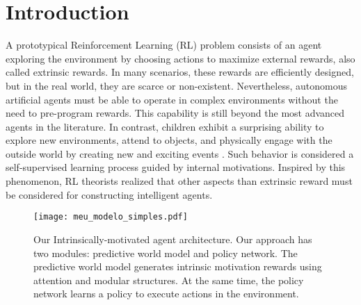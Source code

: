 \section{Introduction}
\label{sec:introduction}



A prototypical Reinforcement Learning (RL) problem consists of an agent exploring the environment by choosing actions to maximize external rewards, also called extrinsic rewards. In many scenarios, these rewards are efficiently designed, but in the real world, they are scarce or non-existent. Nevertheless, autonomous artificial agents must be able to operate in complex environments without the need to pre-program rewards. This capability is still beyond the most advanced agents in the literature. In contrast, children exhibit a surprising ability to explore new environments, attend to objects, and physically engage with the outside world by creating new and exciting events \cite{haber2018learning}. Such behavior is considered a self-supervised learning process guided by internal motivations. Inspired by this phenomenon, RL theorists realized that other aspects than extrinsic reward must be considered for constructing intelligent agents.


\begin{figure}[htbp]
  \centering

   \texttt{[image: meu\_modelo\_simples.pdf]}

   \caption{Our Intrinsically-motivated agent architecture. Our approach has two modules: predictive world model and policy network. The predictive world model generates intrinsic motivation rewards using attention and modular structures. At the same time, the policy network learns a policy to execute actions in the environment.}
   \label{fig:meu_modelo_simples}
\end{figure}


